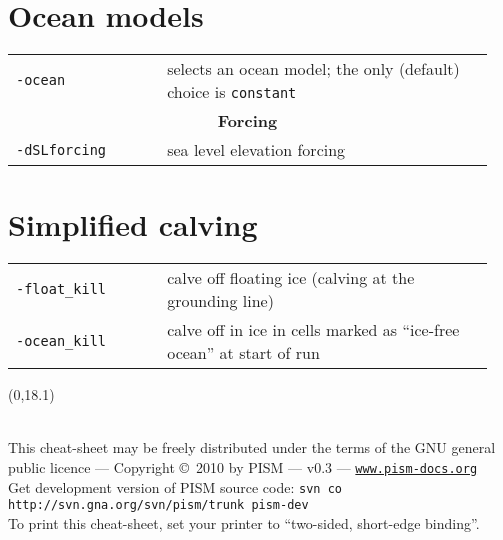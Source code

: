 \documentclass[landscape]{article}
\newcommand{\PISMDOWNLOADMSG}{Get development version of PISM source code: \texttt{svn co http://svn.gna.org/svn/pism/trunk pism-dev}}
\newcommand{\tabletitle}[1]{\multicolumn{2}{c}{\textbf{#1}}}
\begin{document}
\begin{textblock}{15}
\section{Ocean models}
\label{sec:ocean-models}

\begin{tabular}{@{}p{0.3\linewidth}p{0.65\linewidth}@{}}
\texttt{-ocean} & selects an ocean model; the only (default) choice is
\texttt{constant} \\
\tabletitle{Forcing} \\
\texttt{-dSLforcing} & sea level elevation forcing\\
\end{tabular}

\section{Simplified calving}
\label{sec:calving}
\begin{tabular}{@{}p{0.3\linewidth}p{0.65\linewidth}@{}}
  \texttt{-float_kill} & calve off floating ice (calving at the grounding
  line)\\
\texttt{-ocean_kill} & calve off in ice in cells marked as ``ice-free
ocean'' at start of run
\end{tabular}

\end{textblock}

\null\newpage
\begin{textblock}{47}(0,18.1)
  \begin{center}
    \hrulefill\\
    This cheat-sheet may be freely distributed under the terms of the GNU general
    public licence --- Copyright \copyright\ 2010 by PISM --- v0.3 ---
    \href{http://www.pism-docs.org}{\texttt{www.pism-docs.org}}\\
    \PISMDOWNLOADMSG\\
    To print this cheat-sheet, set your printer to ``two-sided, short-edge binding''.
 \end{center}
\end{textblock}
\end{document}

